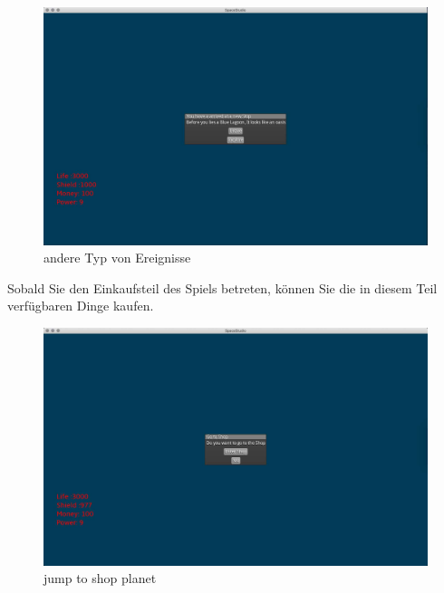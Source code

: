 \documentclass[12pt]{article}
\begin{document}
\begin{figure}[htp]
\centering
\includegraphics[scale=0.4]{TestProtocolBilder/otherEreignisse.jpg}
\caption{andere Typ von Ereignisse}
\end{figure}
Sobald Sie den Einkaufsteil des Spiels betreten, können Sie die in diesem Teil verfügbaren Dinge kaufen.
\begin{figure}[htp]
\centering
\includegraphics[scale=0.4]{TestProtocolBilder/shopPlanetJump.jpg}
\caption{jump to shop planet }
\end{figure}
\newpage
\end{document}
